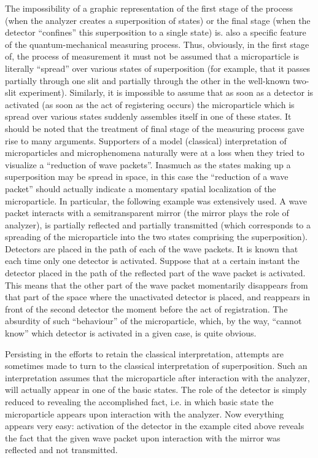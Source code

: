 \documentclass[a4paper,sfsidenotes,colorlinks=true]{tufte-book}
\numberwithin{equation}{section}
\numberwithin{figure}{section}
\begin{document}
The impossibility of a graphic representation of the first stage of
the process (when the analyzer creates a superposition of states) or
the final stage (when the detector ``confines'' this superposition to
a single state) is. also a specific feature of the quantum-mechanical
measuring process. Thus, obviously, in the first stage of, the process
of measurement it must not be assumed that a microparticle is
literally ``spread'' over various states of superposition (for
example, that it passes partially through one slit and partially
through the other in the well-known two-slit experiment). Similarly,
it is impossible to assume that as soon as a detector is activated (as
soon as the act of registering occurs) the microparticle which is
spread over various states suddenly assembles itself in one of these
states. It should be noted that the treatment of final stage of the
measuring process gave rise to many arguments. Supporters of a model
(classical) interpretation of microparticles and microphenomena
naturally were at a loss when they tried to visualize a ``reduction of
wave packets''. Inasmuch as the states making up a superposition may
be spread in space, in this case the ``reduction of a wave packet''
should actually indicate a momentary spatial localization of the
microparticle. In particular, the following example was extensively
used. A wave packet interacts with a semitransparent mirror (the
mirror plays the role of analyzer), is partially reflected and
partially transmitted (which corresponds to a spreading of the
microparticle into the two states comprising the
superposition). Detectors are placed in the path of each of the wave
packets. It is known that each time only one detector is
activated. Suppose that at a certain instant the detector placed in
the path of the reflected part of the wave packet is activated. This
means that the other part of the wave packet momentarily disappears
from that part of the space where the unactivated detector is placed,
and reappears in front of the second detector the moment before the
act of registration. The absurdity of such ``behaviour'' of the
microparticle, which, by the way, ``cannot know'' which detector is
activated in a given case, is quite obvious.


Persisting in the efforts to retain the classical interpretation,
attempts are sometimes made to turn to the classical interpretation of
superposition. Such an interpretation assumes that the microparticle
after interaction with the analyzer, will actually appear in one of
the basic states. The role of the detector is simply reduced to
revealing the accomplished fact, i.e. in which basic state the
microparticle appears upon interaction with the analyzer. Now
everything appears very easy: activation of the detector in the
example cited above reveals the fact that the given wave packet upon
interaction with the mirror was reflected and not transmitted.
\end{document}
